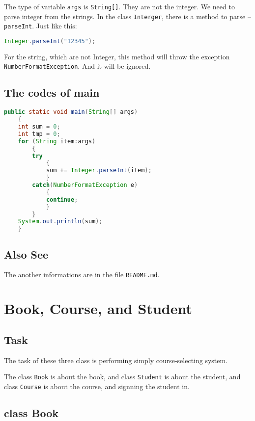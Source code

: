 \documentclass{ctexart}
\begin{document}
The type of variable \lstinline|args| is \lstinline|String[]|.
They are not the integer. We need to parse integer from the strings.
In the class \lstinline|Interger|, there is a method to parse --
\lstinline|parseInt|. Just like this:
\begin{lstlisting}[language=Java,caption=Parsing Integer]
Integer.parseInt("12345");
\end{lstlisting}

For the string, which are not Integer, this method will throw the exception \lstinline|NumberFormatException|. And it will be ignored.

\subsection{The codes of main}

\begin{lstlisting}[language=Java,caption=Main Function]
public static void main(String[] args)
    {
	int sum = 0;
	int tmp = 0;
	for (String item:args)
	    {
		try
		    {
			sum += Integer.parseInt(item);
		    }
		catch(NumberFormatException e)
		    {
			continue;
		    }
	    }
	System.out.println(sum);
    }
\end{lstlisting}

\subsection{Also See}

The another informations are in the file \verb|README.md|.

\section{Book, Course, and Student}

\subsection{Task}

The task of these three class is performing simply course-selecting system.

The class \lstinline|Book| is about the book, and class \lstinline|Student| is about the student,
and class \lstinline|Course| is about the course, and signning the student in.

\subsection{class Book}
\end{document}
